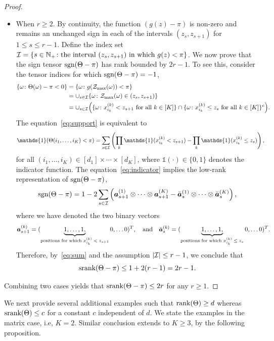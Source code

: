 \documentclass[11pt]{article}
\theoremstyle{plain}
\theoremstyle{definition}
\newcommand*{\KeepStyleUnderBrace}[1]{%
  \mathop{%
    \mathchoice
    {\underbrace{\displaystyle#1}}%
    {\underbrace{\textstyle#1}}%
    {\underbrace{\scriptstyle#1}}%
    {\underbrace{\scriptscriptstyle#1}}%
  }\limits
}
\def\sign{\textup{sgn}}
\def\srank{\textup{srank}}
\def\rank{\textup{rank}}
\begin{document}
\begin{proof}
\begin{itemize}[leftmargin=*,topsep=0pt,itemsep=-1ex,partopsep=1ex,parsep=1ex]
\item When $r\geq 2$.   By continuity, the function $(g(z)-\pi)$ is non-zero and remains an unchanged sign in each of the intervals $(z_s, z_{s+1})$ for $1\leq s\leq r-1$. Define the index set $\mathcal{I}=\{s\in\mathbb{N}_{+}\colon \text{the interval $(z_s, z_{s+1})$ in which $g(z)<\pi$}\}$. 
We now prove that the sign tensor $\sign(\Theta-\pi)$ has rank bounded by $2r-1$. To see this, consider the tensor indices for which $\sign(\Theta-\pi)=-1$,
\begin{align}\label{eq:support}
\{\omega\colon \Theta(\omega)-\pi <0 \} & = \{\omega \colon g(\mathcal{Z}_{\max}(\omega))<\pi\} \notag \\
&=\cup_{s\in \mathcal{I}} \{\omega\colon \mathcal{Z}_{\max}(\omega)\in(z_s,z_{s+1})\}\notag\\
&=\cup_{s\in \mathcal{I}}\Big( \{\omega\colon \text{$x^{(k)}_{i_k}< z_{s+1}$ for all $k\in[K]$}\}\cap \{\omega\colon \text{$x^{(k)}_{i_k}\leq z_{s}$ for all $k\in[K]$}\}^c\Big).
\end{align}
The equation~\eqref{eq:support} is equivalent to 
\begin{align}\label{eq:indicator}
\mathds{1}(\Theta(i_1,\ldots,i_K)< \pi)&
=\sum_{s\in \tI}\left( \prod_k \mathds{1}(x^{(k)}_{i_k}< z_{s+1}) - \prod_k \mathds{1}(x^{(k)}_{i_k}\leq z_{s})\right),
\end{align}
for all $(i_1,\ldots,i_K)\in[d_1]\times \cdots\times[d_K]$, where $\mathds{1}(\cdot)\in\{0,1\}$ denotes the indicator function. The equation~\eqref{eq:indicator} implies the low-rank representation of $\sign(\Theta-\pi)$,
\begin{equation}\label{eq:sum}
\sign(\Theta-\pi)=1-2\sum_{s\in \tI } \left(\ma^{(1)}_{s+1}\otimes\cdots\otimes \ma^{(K)}_{s+1} - \bar \ma^{(1)}_s\otimes\cdots\otimes \bar \ma^{(K)}_s\right),
\end{equation}
where we have denoted the two binary vectors 
\[
\ma^{(k)}_{s+1}=(\KeepStyleUnderBrace{1,\ldots,1,}_{\text{positions for which $x_{i_k}^{(k)}<z_{s+1}$}}0,\ldots 0)^T,\quad \text{and}\quad
\bar \ma^{(k)}_s=(\KeepStyleUnderBrace{1,\ldots,1,}_{\text{positions for which $x_{i_k}^{(k)}\leq z_{s}$}}0,\ldots 0)^T.
\]
Therefore, by~\eqref{eq:sum} and the assumption $|\mathcal{I}|\leq r-1$, we conclude that 
\[
\srank(\Theta-\pi)\leq 1+2(r-1)=2r-1.
\]
\end{itemize}
Combining two cases yields that $\srank(\Theta-\pi)\leq 2r$ for any $r\geq 1$.
\end{proof}

We next provide several additional examples such that $\rank(\Theta)\geq d$ whereas $\srank(\Theta)\leq c$ for a constant $c$ independent of $d$. We state the examples in the matrix case, i.e, $K=2$. Similar conclusion extends to $K\geq 3$, by the following proposition. \\
\end{document}

